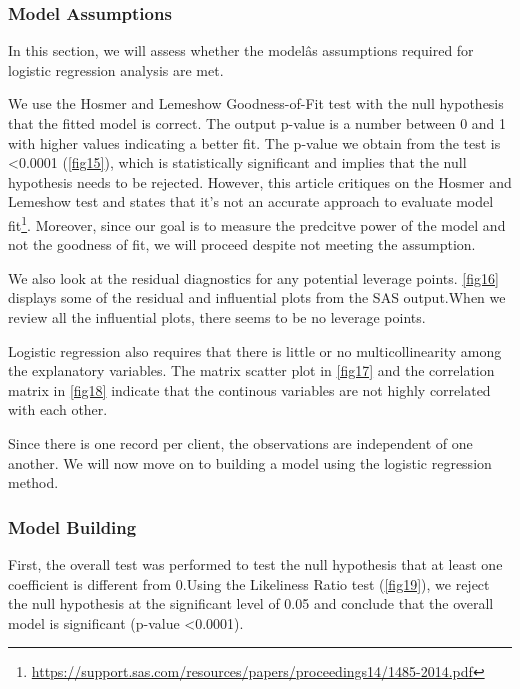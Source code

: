 \documentclass[]{article}
\let\rmarkdownfootnote\footnote%
\def\footnote{\protect\rmarkdownfootnote}
\begin{document}
\subsubsection{Model Assumptions}\label{model-assumptions}

In this section, we will assess whether the modelâs assumptions
required for logistic regression analysis are met.

We use the Hosmer and Lemeshow Goodness-of-Fit test with the null
hypothesis that the fitted model is correct. The output p-value is a
number between 0 and 1 with higher values indicating a better fit. The
p-value we obtain from the test is \textless{}0.0001 (\autoref{fig15}),
which is statistically significant and implies that the null hypothesis
needs to be rejected. However, this article critiques on the Hosmer and
Lemeshow test and states that it's not an accurate approach to evaluate
model fit\footnote{\url{https://support.sas.com/resources/papers/proceedings14/1485-2014.pdf}}.
Moreover, since our goal is to measure the predcitve power of the model
and not the goodness of fit, we will proceed despite not meeting the
assumption.

We also look at the residual diagnostics for any potential leverage
points. \autoref{fig16} displays some of the residual and influential
plots from the SAS output.When we review all the influential plots,
there seems to be no leverage points.

Logistic regression also requires that there is little or no
multicollinearity among the explanatory variables. The matrix scatter
plot in \autoref{fig17} and the correlation matrix in \autoref{fig18}
indicate that the continous variables are not highly correlated with
each other.

Since there is one record per client, the observations are independent
of one another. We will now move on to building a model using the
logistic regression method.

\subsubsection{Model Building}\label{model-building}

First, the overall test was performed to test the null hypothesis that
at least one coefficient is different from 0.Using the Likeliness Ratio
test (\autoref{fig19}), we reject the null hypothesis at the significant
level of 0.05 and conclude that the overall model is significant
(p-value \textless{}0.0001).
\end{document}
